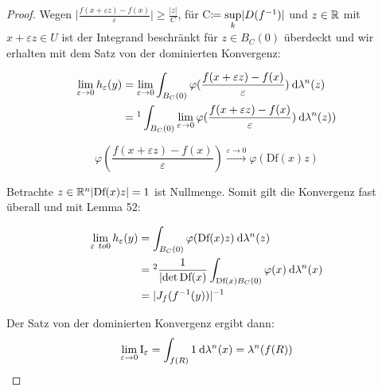 \documentclass[skript.tex]{subfiles}
\begin{document}
\begin{proof}
		Wegen $\lvert \frac{f(x+ \varepsilon z) - f(x)}{\varepsilon} \rvert \geq \frac{\lvert z \rvert}{C}$, für C$\coloneqq \sup\limits_{k} \lvert D(f^{-1}) \rvert$ und $z \in \mathbb{R}$ mit $x + \varepsilon z \in U$ ist der Integrand beschränkt für $ z \in B_C(0)$ überdeckt und wir erhalten mit dem Satz von der dominierten Konvergenz:
	
		\begin{align*}
		\lim\limits_{\varepsilon \to 0} h_{\varepsilon}(y)
	&	= \lim\limits_{\varepsilon \to 0}  \int_{B_C(0)} \varphi(\frac{f(x+ \varepsilon z) - f(x)}{\varepsilon}) \md \lambda^n(z) \\
    &	=\footnotemark \int_{B_C(0)} \lim\limits_{\varepsilon \to 0} \varphi(\frac{f(x+ \varepsilon z) - f(x)}{\varepsilon}) \md \lambda^n(z)) 
		\end{align*}
		
		\begin{equation*}
		\varphi(\frac{f(x+ \varepsilon z) - f(x)}{\varepsilon}) \stackrel{ \varepsilon \to 0}{\to} \varphi (\text{Df}(x)z)
		\end{equation*}
		
		Betrachte {$z \in \mathbb{R}^n \lvert \text{Df}(x)z \rvert = 1$} ist Nullmenge. Somit gilt die Konvergenz fast überall und mit Lemma 52:
		
		\begin{align*}
		\lim\limits_{\varepsilon \ to 0} h_{\varepsilon}(y) &= \int_{B_C(0)} \varphi(\text{Df}(x)z) \md \lambda^n(z) \\
		&	=\footnotemark \frac{1}{\lvert \det \text{Df}(x)} \int_{\text{Df}(x)B_C(0)}\varphi(x) \md \lambda^n(x) \\
		&  =\lvert J_f (f^{-1}(y))\rvert^{-1}
		\end{align*}
		
		Der Satz von der dominierten Konvergenz ergibt dann:
		\begin{equation*}
		\lim\limits_{\varepsilon \to 0} \text{I}_{\varepsilon} = \int_{f(R)} 1 \: \mathrm{d} \lambda^n(x) = \lambda^n(f(R))
		\end{equation*}
		

\end{proof}
\end{document}
